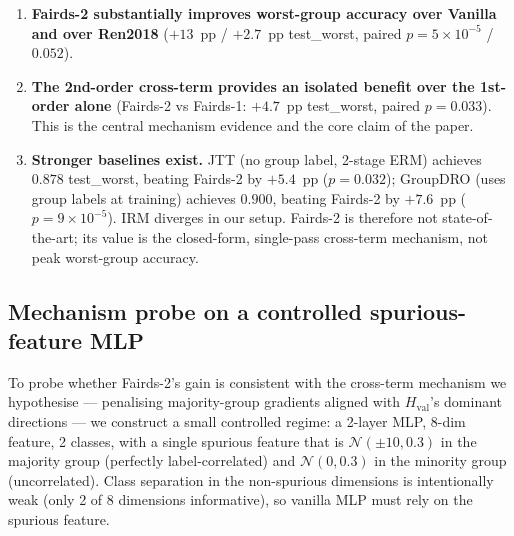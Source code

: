 \begin{enumerate}[leftmargin=1.2em, itemsep=2pt, topsep=3pt]
\item \textbf{Fairds-2 substantially improves worst-group accuracy over
Vanilla and over Ren2018} ($+13$~pp / $+2.7$~pp test\_worst,
paired $p\!=\!5\!\times\!10^{-5}$ / $0.052$).
\item \textbf{The 2nd-order cross-term provides an isolated benefit over
the 1st-order alone} (Fairds-2 vs Fairds-1: $+4.7$~pp test\_worst,
paired $p\!=\!0.033$). This is the central mechanism evidence and the
core claim of the paper.
\item \textbf{Stronger baselines exist.} JTT (no group label, 2-stage
ERM) achieves $0.878$ test\_worst, beating Fairds-2 by $+5.4$~pp
($p\!=\!0.032$); GroupDRO (uses group labels at training) achieves
$0.900$, beating Fairds-2 by $+7.6$~pp ($p\!=\!9\!\times\!10^{-5}$).
IRM diverges in our setup. Fairds-2 is therefore not state-of-the-art;
its value is the closed-form, single-pass cross-term mechanism, not
peak worst-group accuracy.
\end{enumerate}

\begin{table}[t]
\centering\footnotesize

\caption{\textbf{Colored MNIST extended baselines} (mean $\pm$ std,
10 seeds, best-tuned $\eta$). \textit{Italics} = our methods.
\textbf{Bold} = best in column. Higher is better.}
\label{tab:cmnist_extended}
\end{table}

\begin{table}[t]
\centering\footnotesize

\caption{\textbf{Paired tests vs Fairds-2} (one-sided, same seed).
JTT and GroupDRO are stronger; Vanilla and Fairds-1 are weaker.}
\label{tab:cmnist_pairwise_f2}
\end{table}

\subsection{Mechanism probe on a controlled spurious-feature MLP}
\label{sec:exp:e1b}

To probe whether Fairds-2's gain is consistent with the cross-term
mechanism we hypothesise --- penalising majority-group gradients aligned with
$H_{\mathrm{val}}$'s dominant directions --- we construct a small
controlled regime: a 2-layer MLP, 8-dim feature, 2 classes, with a
single spurious feature that is $\mathcal{N}(\pm 10, 0.3)$ in the
majority group (perfectly label-correlated) and $\mathcal{N}(0, 0.3)$
in the minority group (uncorrelated). Class separation in the
non-spurious dimensions is intentionally weak (only 2 of 8 dimensions
informative), so vanilla MLP must rely on the spurious feature.

